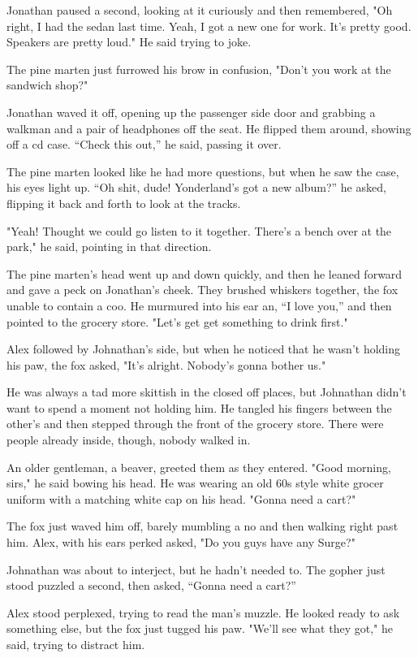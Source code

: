Jonathan paused a second, looking at it curiously and then remembered,
"Oh right, I had the sedan last time. Yeah, I got a new one for work.
It's pretty good. Speakers are pretty loud." He said trying to joke.

The pine marten just furrowed his brow in confusion, "Don't you work at
the sandwich shop?"

Jonathan waved it off, opening up the passenger side door and grabbing a
walkman and a pair of headphones off the seat. He flipped them around,
showing off a cd case. ``Check this out,'' he said, passing it over.

The pine marten looked like he had more questions, but when he saw the
case, his eyes light up. ``Oh shit, dude! Yonderland's got a new album?''
he asked, flipping it back and forth to look at the tracks.

"Yeah! Thought we could go listen to it together. There's a bench over
at the park," he said, pointing in that direction.

The pine marten's head went up and down quickly, and then he leaned
forward and gave a peck on Jonathan's cheek. They brushed whiskers
together, the fox unable to contain a coo. He murmured into his ear an,
``I love you,'' and then pointed to the grocery store. "Let's get get
something to drink first."

Alex followed by Johnathan's side, but when he noticed that he wasn't
holding his paw, the fox asked, "It's alright. Nobody's gonna bother
us."

He was always a tad more skittish in the closed off places, but
Johnathan didn't want to spend a moment not holding him. He tangled his
fingers between the other's and then stepped through the front of the
grocery store. There were people already inside, though, nobody walked
in.

An older gentleman, a beaver, greeted them as they entered. "Good
morning, sirs," he said bowing his head. He was wearing an old 60s style
white grocer uniform with a matching white cap on his head. "Gonna need
a cart?"

The fox just waved him off, barely mumbling a no and then walking right
past him. Alex, with his ears perked asked, "Do you guys have any
Surge?"

Johnathan was about to interject, but he hadn't needed to. The gopher
just stood puzzled a second, then asked, ``Gonna need a cart?''

Alex stood perplexed, trying to read the man's muzzle. He looked ready
to ask something else, but the fox just tugged his paw. "We'll see what
they got," he said, trying to distract him.


